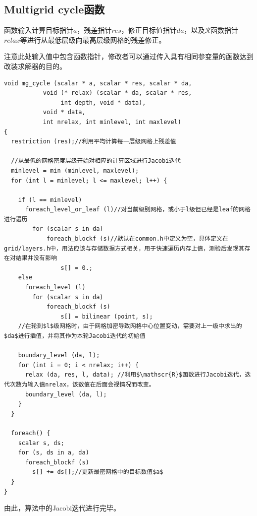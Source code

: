 \documentclass[lang=cn,11pt,a4paper]{elegantpaper}
\begin{document}
\subsection{Multigrid cycle函数}\label{sec:multicycle}
函数输入计算目标指针$a$，残差指针$res$，修正目标值指针$da$，以及$\mathscr{R}$函数指针$relax$等进行从最低层级向最高层级网格的残差修正。\par
注意此处输入值中包含函数指针，修改者可以通过传入具有相同参变量的函数达到改装求解器的目的。
\begin{verbatim}
void mg_cycle (scalar * a, scalar * res, scalar * da,
           void (* relax) (scalar * da, scalar * res, 
                int depth, void * data),
           void * data,
           int nrelax, int minlevel, int maxlevel)
{
  restriction (res);//利用平均计算每一层级网格上残差值
  
  //从最低的网格密度层级开始对相应的计算区域进行Jacobi迭代
  minlevel = min (minlevel, maxlevel);
  for (int l = minlevel; l <= maxlevel; l++) {

    if (l == minlevel)
      foreach_level_or_leaf (l)//对当前级别网格，或小于l级但已经是leaf的网格进行遍历
        for (scalar s in da)
            foreach_blockf (s)//默认在common.h中定义为空，具体定义在grid/layers.h中，用法应该与存储数据方式相关，用于快速遍历内存上值，测验后发现其存在对结果并没有影响
                s[] = 0.;
    else
      foreach_level (l)
        for (scalar s in da)
            foreach_blockf (s)
                s[] = bilinear (point, s);
    //在轮到$l$级网格时，由于网格加密导致网格中心位置变动，需要对上一级中求出的$da$进行插值，并将其作为本轮Jacobi迭代的初始值
    
    boundary_level (da, l);
    for (int i = 0; i < nrelax; i++) {
      relax (da, res, l, data); //利用$\mathscr{R}$函数进行Jacobi迭代，迭代次数为输入值nrelax，该数值在后面会视情况而改变。
      boundary_level (da, l);
    }
  }

  foreach() {
    scalar s, ds;
    for (s, ds in a, da)
      foreach_blockf (s)
        s[] += ds[];//更新最密网格中的目标数值$a$
  }
}

\end{verbatim}
由此，算法中的Jacobi迭代进行完毕。
\end{document}
